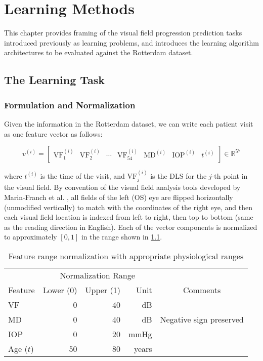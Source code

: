 \chapter{Learning Methods} \label{chapter:methods}

This chapter provides framing of the visual field progression prediction tasks introduced previously as learning problems, and introduces the learning algorithm architectures to be evaluated against the Rotterdam dataset. 

\section{The Learning Task}

\subsection{Formulation and Normalization}

Given the information in the Rotterdam dataset, we can write each patient visit as one feature vector as follows:

\begin{equation}
v^{(i)} = \begin{bmatrix}
\textrm{VF}^{(i)}_1 & 
\textrm{VF}^{(i)}_2 & 
\cdots & 
\textrm{VF}^{(i)}_{54} & 
\textrm{MD}^{(i)} & 
\textrm{IOP}^{(i)} & 
t^{(i)}
\end{bmatrix}
\in \mathbb{R}^{57}
\end{equation}

where $t^{(i)}$ is the time of the visit, and $\textrm{VF}^{(i)}_j$ is the \ac{DLS} for the $j$-th point in the visual field. By convention of the visual field analysis tools developed by Marin-Franch et al. \cite{Marin-Franch2013}, all fields of the left (OS) eye are flipped horizontally (unmodified vertically) to match with the coordinates of the right eye, and then each visual field location is indexed from left to right, then top to bottom (same as the reading direction in English). Each of the vector components is normalized to approximately $[0, 1]$ in the range shown in \cref{tab:norm}.

\begin{table}[h]
\centering
\caption{Feature range normalization with appropriate physiological ranges}
\begin{tabular}{@{}lrrrc@{}}
\toprule
 & \multicolumn{3}{c}{Normalization Range} & \\
\cmidrule{2-4}
Feature & Lower (0) & Upper (1) & Unit & Comments \\ 
\midrule
VF & 0 & 40 & dB &  \\
MD & 0 & 40 & dB & Negative sign preserved \\
IOP & 0 & 20 & mmHg &  \\
Age ($t$) & 50 & 80 & years &  \\ 
\bottomrule
\end{tabular}
\label{tab:norm}
\end{table}

